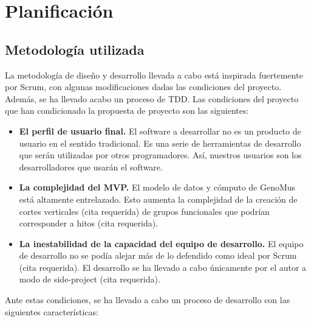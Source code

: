 \chapter{Planificación} 

\section{Metodología utilizada}

La metodología de diseño y desarrollo llevada a cabo está inspirada fuertemente por Scrum, con algunas modificaciones dadas las condiciones del proyecto. Además, se ha llevado acabo un proceso de TDD. Las condiciones del proyecto que han condicionado la propuesta de proyecto son las siguientes:

\begin{itemize}
    \item \textbf{El perfil de usuario final.} El software a desarrollar no es un producto de usuario en el sentido tradicional. Es una serie de herramientas de desarrollo que serán utilizadas por otros programadores. Así, nuestros usuarios son los desarrolladores que usarán el software.

    \item \textbf{La complejidad del MVP.} El modelo de datos y cómputo de GenoMus\cite{GenoMus} está altamente entrelazado. Esto aumenta la complejidad de la creación de cortes verticales (cita requerida) de grupos funcionales que podrían corresponder a hitos (cita requerida).
    
    \item \textbf{La inestabilidad de la capacidad del equipo de desarrollo.} El equipo de desarrollo no se podía alejar más de lo defendido como ideal por Scrum (cita requerida). El desarrollo se ha llevado a cabo únicamente por el autor a modo de side-project (cita requerida).
\end{itemize}

Ante estas condiciones, se ha llevado a cabo un proceso de desarrollo con las siguientes características:

